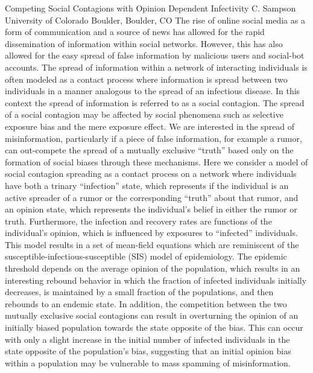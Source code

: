 
    \begin{abstract_online}{Competing Social Contagions with Opinion Dependent Infectivity}{%
        C. Sampson}{%
        }{%
        University of Colorado Boulder, Boulder, CO}
    The rise of online social media as a form of communication and a source of news has allowed for the rapid dissemination of information within social networks. However, this has also allowed for the easy spread of false information by malicious users and social-bot accounts. The spread of information within a network of interacting individuals is often modeled as a contact process where information is spread between two individuals in a manner analogous to the spread of an infectious disease. In this context the spread of information is referred to as a social contagion. The spread of a social contagion may be affected by social phenomena such as selective exposure bias and the mere exposure effect. We are interested in the spread of misinformation, particularly if a piece of false information, for example a rumor, can out-compete the spread of a mutually exclusive “truth” based only on the formation of social biases through these mechanisms. Here we consider a model of social contagion spreading as a contact process on a network where individuals have both a trinary “infection” state, which represents if the individual is an active spreader of a rumor or the corresponding “truth” about that rumor, and an opinion state, which represents the individual’s belief in either the rumor or truth. Furthermore, the infection and recovery rates are functions of the individual’s opinion, which is influenced by exposures to “infected” individuals. This model results in a set of mean-field equations which are reminiscent of the susceptible-infectious-susceptible (SIS) model of epidemiology. The epidemic threshold depends on the average opinion of the population, which results in an interesting rebound behavior in which the fraction of infected individuals initially decreases, is maintained by a small fraction of the populations, and then rebounds to an endemic state. In addition, the competition between the two mutually exclusive social contagions can result in overturning the opinion of an initially biased population towards the state opposite of the bias. This can occur with only a slight increase in the initial number of infected individuals in the state opposite of the population’s bias, suggesting that an initial opinion bias within a population may be vulnerable to mass spamming of misinformation. 
    
    \end{abstract_online}
    